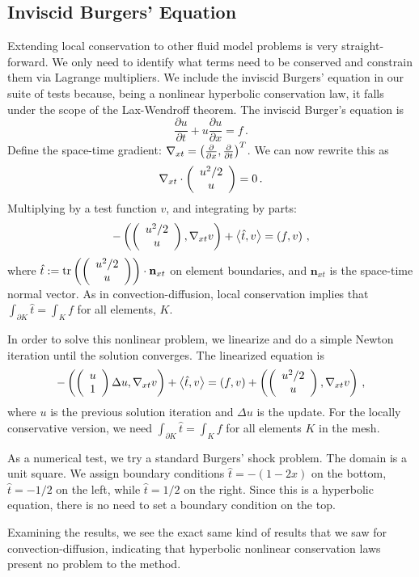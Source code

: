 \documentclass[Proposal.tex]{subfiles}
\begin{document}
\subsection{Inviscid Burgers' Equation}
Extending local conservation to other fluid model problems is very straight-forward. 
We only need to identify what terms need to be conserved and constrain them via Lagrange multipliers.
We include the inviscid Burgers' equation in our suite of tests because, being
a nonlinear hyperbolic conservation law, it
falls under the scope of the Lax-Wendroff theorem.
The inviscid Burger's equation is
\[
\frac{\partial u}{\partial t}+u\frac{\partial u}{\partial x}=f\,.
\]
Define the space-time gradient: $\nabla_{xt}=\left( \frac{\partial}{\partial
x},\frac{\partial}{\partial t} \right)^T$. We can now rewrite this as
\[
\nabla_{xt}\cdot\left( \begin{array}{c} u^2/2\\ u\\ \end{array} \right)=0\,.
\]
Multiplying by a test function $v$, and integrating by parts:
\[
-\left( \left( \begin{array}{c} u^2/2\\ u\\ \end{array} \right),\nabla_{xt}v \right)+\left\langle \hat t,v \right\rangle=\left( f,v \right)\,,
\]
where $\hat t:=\operatorname*{tr}\left( \left( \begin{array}{c} u^2/2\\ u\\ \end{array} \right) \right)\cdot\mathbf{n}_{xt}$ on
element boundaries, and $\mathbf{n}_{xt}$ is the space-time normal vector.
As in convection-diffusion, local conservation implies that
$\int_{\partial K}\hat t=\int_Kf$ for all elements, $K$.

In order to solve this nonlinear problem, we linearize and do a simple Newton iteration
until the solution converges. The linearized equation is
\[
-\left( \left( \begin{array}{c} u\\ 1\\ \end{array} \right)\Delta u,\nabla_{xt}v \right)+\left\langle \hat t,v \right\rangle=\left( f,v \right)
+\left( \left( \begin{array}{c} u^2/2\\ u\\ \end{array} \right),\nabla_{xt}v \right) \,,
\]
where $u$ is the previous solution iteration and $\Delta u$ is the update. 
For the locally conservative version, we need $\int_{\partial K}\hat t=\int_K f$ for all elements $K$ in the mesh.

As a numerical test, we try a standard Burgers' shock problem.
The domain is a unit
square. We assign boundary conditions $\hat t=-(1-2x)$ on the bottom, $\hat
t=-1/2$ on the left, while $\hat t=1/2$ on the right. Since this is a
hyperbolic equation, there is no need to set a boundary condition on the top.

Examining the results, we see the exact same kind of results that we saw for convection-diffusion, indicating that hyperbolic nonlinear conservation laws present no problem to the method.
\end{document}
